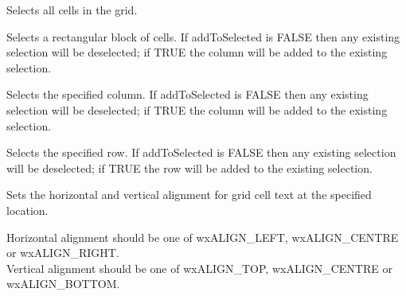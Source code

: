 \label{wxgridselectall}


Selects all cells in the grid.

\label{wxgridselectblock}



Selects a rectangular block of cells. If addToSelected is FALSE then any existing selection will be
deselected; if TRUE the column will be added to the existing selection. 

\label{wxgridselectcol}


Selects the specified column. If addToSelected is FALSE then any existing selection will be
deselected; if TRUE the column will be added to the existing selection.

\label{wxgridselectrow}


Selects the specified row. If addToSelected is FALSE then any existing selection will be
deselected; if TRUE the row will be added to the existing selection.

\label{wxgridsetcellalignment}




Sets the horizontal and vertical alignment for grid cell text at the specified location.

Horizontal alignment should be one of wxALIGN\_LEFT, wxALIGN\_CENTRE or wxALIGN\_RIGHT. \\
Vertical alignment should be one of wxALIGN\_TOP, wxALIGN\_CENTRE or wxALIGN\_BOTTOM.

